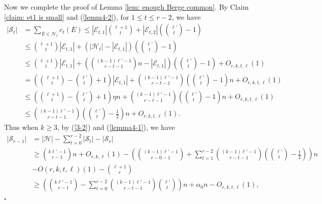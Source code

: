 \documentclass[12pt]{article}%
\def\q{\hfill\rule{1ex}{1ex}}
\def\q{\hfill\rule{1ex}{1ex}}
\newenvironment{proof}{{\noindent\it Proof.}}{\hfill $\square$\par}
\newcommand{\ber}{\text{Berge-}}
\newcommand{\mh}{\mathcal{H}}
\begin{document}
\begin{proof}
Now we complete the proof of Lemma \ref{lem: enough Berge common}.
     By Claim \ref{claim: et1 is small} and (\ref{lemm4-2}), for $1\le t\le r-2$, we have
     \begin{equation}\label{lemma4-1}
     \begin{aligned}
     |\mathcal{S}_{t}|&=\sum_{E\in \mh_t}c_t(E)\leq |\mathcal{E}_{t,1}|\binom{\ell+1}{t}+|\mathcal{E}_{t,2}|\left(\binom{\ell'}{t}-1\right)\\
     & \leq \binom{\ell+1}{t}|\mathcal{E}_{t,1}|+(|\mh_t|-|\mathcal{E}_{t,1}|)\left(\binom{\ell'}{t}-1\right)\\
     &\leq  \binom{\ell+1}{t}|\mathcal{E}_{t,1}|+\left(\binom{(k-1)\ell'-1}{r-t-1}n-|\mathcal{E}_{t,1}|\right)\left(\binom{\ell'}{t}-1\right)+O_{r,k,t,\ell}(1)\\
     &=\left(\binom{\ell+1}{t}-\binom{\ell'}{t}+1\right)|\mathcal{E}_{t,1}|+\binom{(k-1)\ell'-1}{r-t-1}\left(\binom{\ell'}{t}-1\right) n+O_{r,k,t,\ell}(1)\\
     &\leq \left(\binom{\ell+1}{t}-\binom{\ell'}{t}+1\right)\eta n+\binom{(k-1)\ell'-1}{r-t-1}\left(\binom{\ell'}{t}-1\right) n+O_{r,k,t,\ell}(1)\\
     &\leq \binom{(k-1)\ell'-1}{r-t-1}\left(\binom{\ell'}{t}-\frac{1}{2}\right) n+O_{r,k,t,\ell}(1).
     \end{aligned}
     \end{equation}
     Thus when $k\geq 3$, by (\ref{3-2}) and (\ref{lemma4-1}), we have
     \begin{equation}\label{4-41}
         \begin{aligned}
             |\mathcal{S}_{r-1}|&=|\mh|-\sum_{t=0}^{r-2}|\mathcal{S}_t|-|\mathcal{S}_r|\\
             &\geq \binom{k\ell'-1}{r-1}n+O_{r,k,\ell}(1)-\left(\binom{(k-1)\ell'-1}{r-0-1}+\sum_{t=1}^{r-2}\binom{(k-1)\ell'-1}{r-t-1}\left(\binom{\ell'}{t}-\frac{1}{2}\right)\right)n\\
            & -O(r,k,t,\ell)(1)-\binom{\ell+1}{r}\\
            &\geq\left(\binom{k\ell'-1}{r-1}-\sum_{t=0}^{r-2}\binom{(k-1)\ell'-1}{r-t-1}\binom{\ell'}{t}\right)n+\alpha_0 n-O_{r,k,t,\ell}(1),
         \end{aligned}

\end{equation}
\end{proof}
\end{document}
